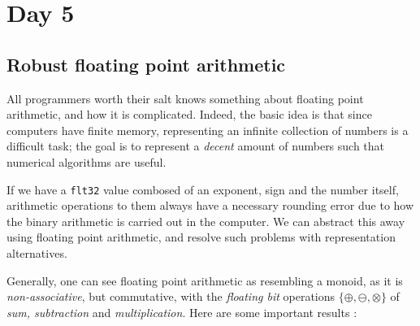 \chapter{Day 5}

\section{Robust floating point arithmetic}

All programmers worth their salt knows something about floating
point arithmetic, and how it is complicated. Indeed, the basic idea is
that since computers have finite memory, representing an infinite collection
of numbers is a difficult task; the goal is to represent a \emph{decent}
amount of numbers such that numerical algorithms are useful.

\spa

If we have a \texttt{flt32} value combosed of an exponent, sign and the
number itself, arithmetic operations to them always have a necessary
rounding error due to how the binary arithmetic is carried out in the
computer. We can abstract this away using floating point arithmetic,
and resolve such problems with representation alternatives. \cite{float1}

\spa

Generally, one can see floating point arithmetic as resembling a monoid, as it is \emph{non-associative}, but commutative,
with the \emph{floating bit} operations $\{\oplus, \ominus, \otimes\}$
of \emph{sum, subtraction} and \emph{multiplication}. Here are some
important results \cite{artof1}:

